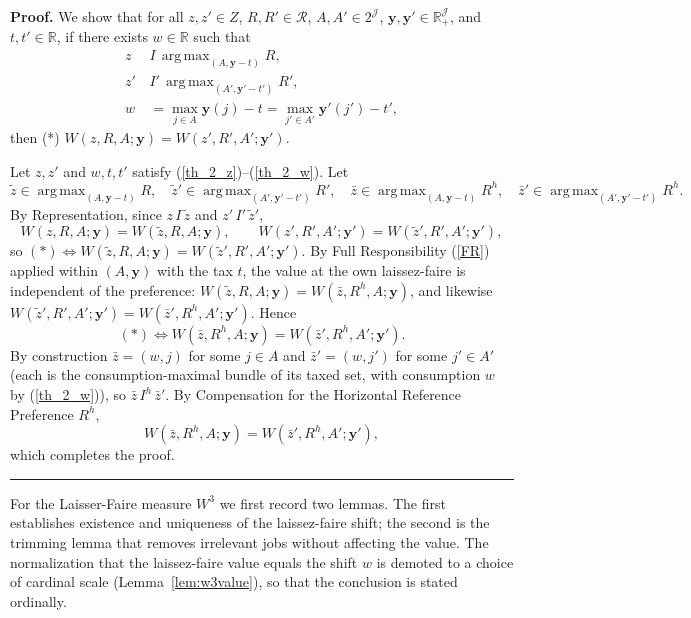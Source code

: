 \documentclass[12pt,thmsb]{article}
\DeclareMathOperator*{\argmax}{arg\,max}
\newenvironment{proof}[1][Proof]{\noindent \textbf{#1.} }{\  \rule{0.5em}{0.5em}}
\begin{document}
\begin{proof}
We show that for all $z,z'\in Z$, $R,R'\in\mathcal R$, $A,A'\in 2^{\mathcal J}$,
$\mathbf y,\mathbf y'\in\mathbb R_+^{\mathcal J}$, and $t,t'\in\mathbb R$, if
there exists $w\in\mathbb R$ such that
\begin{align}
z\,&I\,\argmax_{(A,\mathbf y-t)}R, \label{th_2_z}\\
z'\,&I'\,\argmax_{(A',\mathbf y'-t')}R', \label{th_2_zp}\\
w&=\max_{j\in A}\mathbf y(j)-t=\max_{j'\in A'}\mathbf y'(j')-t', \label{th_2_w}
\end{align}
then (*) $W(z,R,A;\mathbf y)=W(z',R',A';\mathbf y')$.

Let $z,z'$ and $w,t,t'$ satisfy (\ref{th_2_z})--(\ref{th_2_w}). Let
\begin{equation*}
\tilde z\in\argmax_{(A,\mathbf y-t)}R,\quad
\tilde z'\in\argmax_{(A',\mathbf y'-t')}R',\quad
\bar z\in\argmax_{(A,\mathbf y-t)}R^h,\quad
\bar z'\in\argmax_{(A',\mathbf y'-t')}R^h.
\end{equation*}
By Representation, since $z\,I\,\tilde z$ and $z'\,I'\,\tilde z'$,
\begin{equation*}
W(z,R,A;\mathbf y)=W(\tilde z,R,A;\mathbf y),\qquad
W(z',R',A';\mathbf y')=W(\tilde z',R',A';\mathbf y'),
\end{equation*}
so $(*)\Leftrightarrow W(\tilde z,R,A;\mathbf y)=W(\tilde z',R',A';\mathbf y')$.
By Full Responsibility (\ref{FR}) applied within $(A,\mathbf y)$ with the tax
$t$, the value at the own laissez-faire is independent of the preference:
$W(\tilde z,R,A;\mathbf y)=W(\bar z,R^h,A;\mathbf y)$, and likewise
$W(\tilde z',R',A';\mathbf y')=W(\bar z',R^h,A';\mathbf y')$. Hence
\begin{equation*}
(*)\Leftrightarrow W(\bar z,R^h,A;\mathbf y)=W(\bar z',R^h,A';\mathbf y').
\end{equation*}
By construction $\bar z=(w,j)$ for some $j\in A$ and $\bar z'=(w,j')$ for some
$j'\in A'$ (each is the consumption-maximal bundle of its taxed set, with
consumption $w$ by (\ref{th_2_w})), so $\bar z\,I^h\,\bar z'$. By Compensation
for the Horizontal Reference Preference $R^h$,
\begin{equation*}
W(\bar z,R^h,A;\mathbf y)=W(\bar z',R^h,A';\mathbf y'),
\end{equation*}
which completes the proof.
\end{proof}

For the Laisser-Faire measure $W^3$ we first record two lemmas. The first
establishes existence and uniqueness of the laissez-faire shift; the second is
the trimming lemma that removes irrelevant jobs without affecting the value. The
normalization that the laissez-faire value equals the shift $w$ is demoted to a
choice of cardinal scale (Lemma~\ref{lem:w3value}), so that the conclusion is
stated ordinally.
\end{document}
